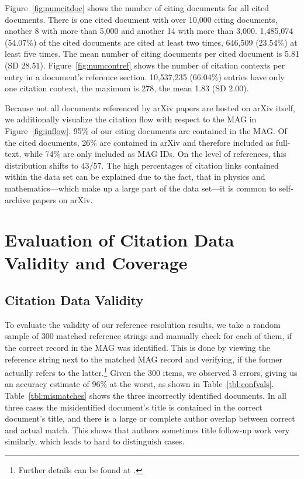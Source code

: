 Figure~\ref{fig:numcitdoc} shows the number of citing documents for all cited documents. There is one cited document with over 10,000 citing documents, another 8 with more than 5,000 and another 14 with more than 3,000. 1,485,074 (54.07\%) of the cited documents are cited at least two times, 646,509 (23.54\%) at least five times. The mean number of citing documents per cited document is 5.81 (SD 28.51). Figure~\ref{fig:numcontref} shows the number of citation contexts per entry in a document's reference section. 10,537,235 (66.04\%) entries have only one citation context, the maximum is 278, the mean 1.83 (SD 2.00).

Because not all documents referenced by arXiv papers are hosted on arXiv itself, we additionally visualize the citation flow with respect to the MAG in Figure~\ref{fig:inflow}. 95\% of our citing documents are contained in the MAG. Of the cited documents, 26\% are contained in arXiv and therefore included as full-text, while 74\% are only included as MAG IDs. On the level of references, this distribution shifts to 43/57. The high percentages of citation links contained within the data set can be explained due to the fact, that in physics and mathematics---which make up a large part of the data set---it is common to self-archive papers on arXiv.

\section{Evaluation of Citation Data Validity and Coverage}
\label{sec:evaluation-validity-and-coverage}

\subsection{Citation Data Validity}
\label{sec:evaluation-reference-resolution}
To evaluate the validity of our reference resolution results, we take a random sample of 300 matched reference strings and manually check for each of them, if the correct record in the MAG was identified. This is done by viewing the reference string next to the matched MAG record and verifying, if the former actually refers to the latter.\footnote{Further details can be found at .} Given the 300 items, we observed 3 errors, giving us an accuracy estimate of 96\% at the worst, as shown in Table~\ref{tbl:confvals}. Table~\ref{tbl:mismatches} shows the three incorrectly identified documents. In all three cases the misidentified document's title is contained in the correct document's title, and there is a large or complete author overlap between correct and actual match. This shows that authors sometimes title follow-up work very similarly, which leads to hard to distinguish cases.

